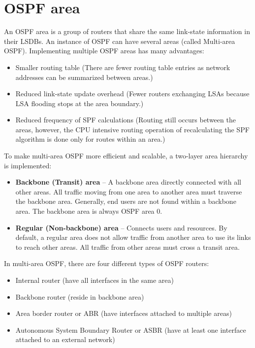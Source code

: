 \section{OSPF area}
An OSPF area is a group of routers that share the same link-state information in their LSDBs. An instance of OSPF can have several areas (called Multi-area OSPF). Implementing multiple OSPF areas has many advantages:

\begin{itemize}
\item Smaller routing table (There are fewer routing table entries as network addresses can be summarized between areas.)
\item Reduced link-state update overhead (Fewer routers exchanging LSAs because LSA flooding stops at the area boundary.)
\item Reduced frequency of SPF calculations (Routing still occurs between the areas, however, the CPU intensive routing operation of recalculating the SPF algorithm is done only for routes within an area.)
\end{itemize}

To make multi-area OSPF more efficient and scalable, a two-layer area hierarchy is implemented:

\begin{itemize}
\item \textbf{Backbone (Transit) area} -- A backbone area directly connected with all other areas. All traffic moving from one area to another area must traverse the backbone area. Generally, end users are not found within a backbone area. The backbone area is always OSPF area 0.
\item \textbf{Regular (Non-backbone) area} -- Connects users and resources. By default, a regular area does not allow traffic from another area to use its links to reach other areas. All traffic from other areas must cross a transit area.
\end{itemize}

In multi-area OSPF, there are four different types of OSPF routers:

\begin{itemize}
\item Internal router (have all interfaces in the same area)
\item Backbone router (reside in backbone area)
\item Area border router or ABR (have interfaces attached to multiple areas)
\item Autonomous System Boundary Router or ASBR (have at least one interface attached to an external network)
\end{itemize}

